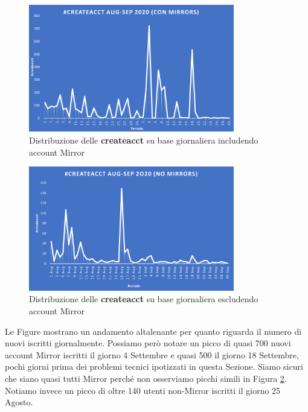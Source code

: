 \begin{figure}[t]
    \centering
    \includegraphics[width=0.8\textwidth]{graphs/daily_createacct.png}
    \caption{Distribuzione delle \textbf{createacct} su base giornaliera includendo account Mirror}
    \label{fig: createacct_daily_conmirr}
\end{figure}    
\begin{figure}[t]
    \centering
    \includegraphics[width=0.8\textwidth]{graphs/daily_createacct_nomirr.png}
    \caption{Distribuzione delle \textbf{createacct} su base giornaliera escludendo account Mirror}
    \label{fig: createacct_daily_nomirr}
\end{figure}

Le Figure mostrano un andamento altalenante per quanto riguarda il numero di nuovi iscritti giornalmente.
Possiamo però notare un picco di quasi 700 nuovi account Mirror iscritti il giorno 4 Settembre e quasi 500 il giorno 18 Settembre, pochi giorni prima dei problemi tecnici ipotizzati in questa Sezione.
Siamo sicuri che siano quasi tutti Mirror perché non osserviamo picchi simili in Figura \ref{fig: createacct_daily_nomirr}.
Notiamo invece un picco di oltre 140 utenti non-Mirror iscritti il giorno 25 Agosto.

